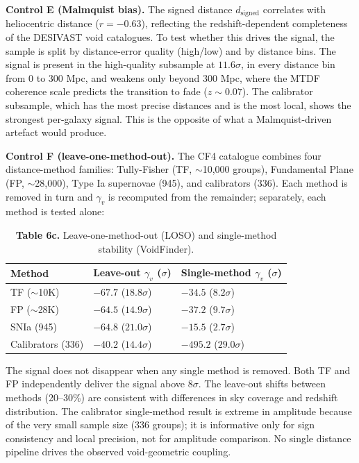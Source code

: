 \documentclass[11pt,a4paper]{article}
\begin{document}
\begin{mdframed}[linecolor=accent,linewidth=0.5pt,backgroundcolor=callout-bg,leftline=true,rightline=true,topline=true,bottomline=true,innerleftmargin=8pt,innerrightmargin=8pt,innertopmargin=6pt,innerbottommargin=6pt]
\textbf{Control E (Malmquist bias).} The signed distance \(d_\mathrm{signed}\) correlates with heliocentric distance (\(r = -0.63\)), reflecting the redshift-dependent completeness of the DESIVAST void catalogues. To test whether this drives the signal, the sample is split by distance-error quality (high/\allowbreak{}low) and by distance bins. The signal is present in the high-quality subsample at \(11.6\sigma\), in every distance bin from 0 to 300 Mpc, and weakens only beyond 300 Mpc, where the MTDF coherence scale predicts the transition to fade (\(z \sim 0.07\)). The calibrator subsample, which has the most precise distances and is the most local, shows the strongest per-galaxy signal. This is the opposite of what a Malmquist-driven artefact would produce.

\textbf{Control F (leave-one-method-out).} The CF4 catalogue combines four distance-method families: Tully-Fisher (TF, \(\sim\)10,000 groups), Fundamental Plane (FP, \(\sim\)28,000), Type Ia supernovae (945), and calibrators (336). Each method is removed in turn and \(\gamma_v\) is recomputed from the remainder; separately, each method is tested alone:

\begin{table}[H]
\centering
\footnotesize
\caption{\textbf{Table 6c.} Leave-one-method-out (LOSO) and single-method stability (VoidFinder).}
\begin{tabularx}{\linewidth}{l>{\RaggedRight\arraybackslash}X>{\RaggedRight\arraybackslash}X}
\toprule
\textbf{Method} & \textbf{Leave-out \(\gamma_v\) (\(\sigma\))} & \textbf{Single-method \(\gamma_v\) (\(\sigma\))} \tabularnewline
\midrule
TF (\(\sim\)10K) & \(-67.7\) (\(18.8\sigma\)) & \(-34.5\) (\(8.2\sigma\)) \tabularnewline
FP (\(\sim\)28K) & \(-64.5\) (\(14.9\sigma\)) & \(-37.2\) (\(9.7\sigma\)) \tabularnewline
SNIa (945) & \(-64.8\) (\(21.0\sigma\)) & \(-15.5\) (\(2.7\sigma\)) \tabularnewline
Calibrators (336) & \(-40.2\) (\(14.4\sigma\)) & \(-495.2\) (\(29.0\sigma\)) \tabularnewline
\bottomrule
\end{tabularx}
\end{table}

The signal does not disappear when any single method is removed. Both TF and FP independently deliver the signal above \(8\sigma\). The leave-out shifts between methods (20--30\%) are consistent with differences in sky coverage and redshift distribution. The calibrator single-method result is extreme in amplitude because of the very small sample size (336 groups); it is informative only for sign consistency and local precision, not for amplitude comparison. No single distance pipeline drives the observed void-geometric coupling.
\end{mdframed}
\end{document}
